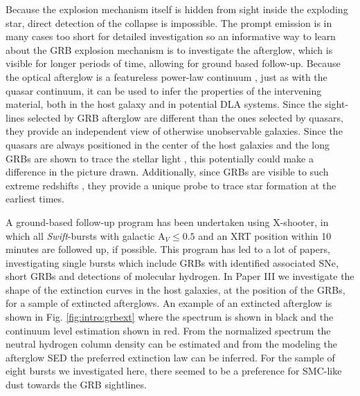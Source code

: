 Because the explosion mechanism itself is hidden from sight inside the exploding
star, direct detection of the collapse is impossible. The prompt
emission is in
many cases too short for detailed investigation so an informative
way to learn
about the GRB explosion mechanism is to investigate the afterglow,
which is
visible for longer periods of time, allowing for ground based
follow-up. Because
the optical afterglow is a featureless power-law continuum \citep{Paradijs2000},
just as with the
quasar continuum, it can be used to infer the properties of the
intervening material, both
in the host galaxy and in potential DLA systems.
Since the sight-lines selected
by GRB afterglow are different than the ones
selected by quasars, they provide
an independent view of otherwise unobservable
galaxies. Since the
quasars are always positioned in the center of the host
galaxies and the
long GRBs are shown to trace the stellar light
\citep{Fruchter2006,
Anderson2015}, this potentially could make a difference in
the picture drawn.
Additionally, since GRBs are visible to such extreme
redshifts
\citep[8.2 and 8.1,][]{Tanvir2009, Salvaterra2009}, they provide a
unique probe to trace star formation at
the earliest times. 

A ground-based follow-up program has been undertaken using X-shooter, in which
all \textit{Swift}-bursts with galactic A$_{V} \leq 0.5$ and an XRT position
within 10 minutes are followed up, if possible. This program has led to a lot of
papers, investigating single bursts \citep[e.g.][to mention some]{Sparre2011,
DElia2014, Kruhler2013a, Xu2013a, DeUgartePostigo2014, Schulze2014a, Japelj2015,
Hartoog2015} which include GRBs with identified associated SNe, short GRBs and
detections of molecular hydrogen. 
In Paper III \citep{Japelj2015} we
investigate the shape of the extinction curves in the host
galaxies, at the
position of the GRBs, for a sample of extincted afterglows. An
example of an
extincted afterglow is shown in Fig. \ref{fig:intro:grbext} where
the spectrum
is shown in black and the continuum level estimation shown in red.
From the
normalized spectrum the neutral hydrogen column density can be
estimated and
from the modeling the afterglow SED the preferred extinction law
can be
inferred. For the sample of eight bursts we investigated here, there
seemed to
be a preference for SMC-like dust towards the GRB sightlines. 

